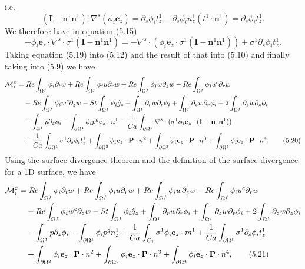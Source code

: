 \documentclass{article}
\begin{document}
i.e.
\begin{equation}
(\mathbf{I} - \mathbf{n}^1 \mathbf{n}^1) : \nabla^s (\phi_i \mathbf{e}_z) = \partial_s \phi_i t_z^1 - \partial_s \phi_i n_z^1 (t^1 \cdot \mathbf{n}^1) = \partial_s \phi_i t_z^1. \tag{5.18}
\end{equation}
We therefore have in equation (5.15)
\begin{equation}
-\phi_i \mathbf{e}_z \cdot \nabla^s \cdot \sigma^1 (\mathbf{I} - \mathbf{n}^1 \mathbf{n}^1) = -\nabla^s \cdot (\phi_i \mathbf{e}_z \cdot \sigma^1 (\mathbf{I} - \mathbf{n}^1 \mathbf{n}^1)) + \sigma^1 \partial_s \phi_i t_z^1. \tag{5.19}
\end{equation}
Taking equation (5.19) into (5.12) and the result of that into (5.10) and finally taking into (5.9) we have
\begin{align}
\mathcal{M}_i^z &= Re \int_{\Omega^f} \phi_i \partial_t w + Re \int_{\Omega^f} \phi_i u \partial_r w + Re \int_{\Omega^f} \phi_i w \partial_z w - Re \int_{\Omega^f} \phi_i u^c \partial_r w \nonumber\\
&\quad - Re \int_{\Omega^f} \phi_i w^c \partial_z w - St \int_{\Omega^f} \phi_i \hat{g}_z + \int_{\Omega^f} \partial_r w \partial_r \phi_i + \int_{\Omega^f} \partial_z w \partial_r \phi_i + 2 \int_{\Omega^f} \partial_z w \partial_z \phi_i \nonumber\\
&\quad - \int_{\Omega^f} p \partial_z \phi_i - \int_{\partial \Omega^1} \phi_i p^g \mathbf{e}_z \cdot n^1 - \frac{1}{Ca} \int_{\partial \Omega^1} \nabla^s \cdot (\sigma^1 \phi_i \mathbf{e}_z \cdot (\mathbf{I} - \mathbf{n}^1 \mathbf{n}^1)) \nonumber\\
&\quad + \frac{1}{Ca} \int_{\partial \Omega^1} \sigma^1 \partial_s \phi_i t_z^1 + \int_{\partial \Omega^2} \phi_i \mathbf{e}_z \cdot \mathbf{P} \cdot n^2 + \int_{\partial \Omega^3} \phi_i \mathbf{e}_z \cdot \mathbf{P} \cdot n^3 + \int_{\partial \Omega^4} \phi_i \mathbf{e}_z \cdot \mathbf{P} \cdot n^4. \tag{5.20}
\end{align}
Using the surface divergence theorem and the definition of the surface divergence for a 1D surface, we have
\begin{align}
\mathcal{M}_i^z &= Re \int_{\Omega^f} \phi_i \partial_t w + Re \int_{\Omega^f} \phi_i u \partial_r w + Re \int_{\Omega^f} \phi_i w \partial_z w - Re \int_{\Omega^f} \phi_i u^c \partial_r w \nonumber\\
&\quad - Re \int_{\Omega^f} \phi_i w^c \partial_z w - St \int_{\Omega^f} \phi_i \hat{g}_z + \int_{\Omega^f} \partial_r w \partial_r \phi_i + \int_{\Omega^f} \partial_z w \partial_r \phi_i + 2 \int_{\Omega^f} \partial_z w \partial_z \phi_i \nonumber\\
&\quad - \int_{\Omega^f} p \partial_z \phi_i - \int_{\partial \Omega^1} \phi_i p^g n_z^1 + \frac{1}{Ca} \int_{C_1} \sigma^1 \phi_i \mathbf{e}_z \cdot m^1 + \frac{1}{Ca} \int_{\partial \Omega^1} \sigma^1 \partial_s \phi_i t_z^1 \nonumber\\
&\quad + \int_{\partial \Omega^2} \phi_i \mathbf{e}_z \cdot \mathbf{P} \cdot n^2 + \int_{\partial \Omega^3} \phi_i \mathbf{e}_z \cdot \mathbf{P} \cdot n^3 + \int_{\partial \Omega^4} \phi_i \mathbf{e}_z \cdot \mathbf{P} \cdot n^4, \tag{5.21}
\end{align}
\end{document}
